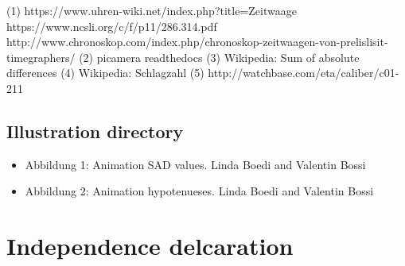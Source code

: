 \documentclass[12pt, a4paper]{report}
\begin{document}
\begin{thebibliography}{9}
\bigskip
{} 
(1) https://www.uhren-wiki.net/index.php?title=Zeitwaage
 https://www.ncsli.org/c/f/p11/286.314.pdf
 http://www.chronoskop.com/index.php/chronoskop-zeitwaagen-von-prelislisit-timegraphers/
\bibitem[Picamera]
(2) picamera readthedocs
\bibitem[SAD]
(3) Wikipedia: Sum of absolute differences
\bibitem[Schlagzahl]
(4) Wikipedia: Schlagzahl
(5) http://watchbase.com/eta/caliber/c01-211
\end{thebibliography}

\pagebreak

\section {Illustration directory}
\bigskip

\begin{itemize}
\item Abbildung 1: Animation SAD values. Linda Boedi and Valentin Bossi
\item Abbildung 2: Animation hypotenueses. Linda Boedi and Valentin Bossi
\end{itemize}

\chapter{Independence delcaration}
\end{document}
